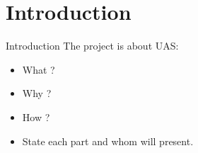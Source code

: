 \section{Introduction}

\begin{frame}{Introduction}{}
  The project is about UAS:
  \begin{itemize}
    \item What ? 
    \item Why ?
    \item How ? 
    \item State each part and whom will present.
  \end{itemize}
\end{frame}


